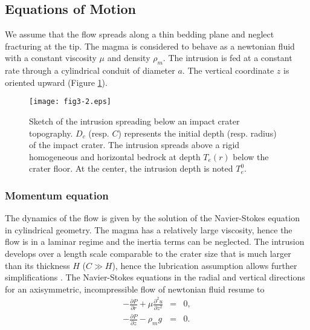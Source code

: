 \subsection{Equations of Motion}
	
We assume that the flow spreads along a thin bedding plane and neglect
fracturing  at the  tip.   The  magma is  considered  to  behave as  a
newtonian  fluid   with  a   constant  viscosity  $\mu$   and  density
$\rho_{m}$.   The  intrusion is  fed  at  a  constant rate  through  a
cylindrical conduit of  diameter $a$.  The vertical  coordinate $z$ is
oriented upward (Figure \ref{C5-fig3-2}).

\begin{figure}[h!]
  \graphicspath{ {/Users/thorey/Documents/These/Submission/Article/FFC_JGR_2013/Paper_APRES_2nd_REVIEW/} }
  \begin{center}
    \texttt{[image: fig3-2.eps]}
    \caption{Sketch of the intrusion  spreading below an impact crater
      topography.  $D_{c}$  (resp.  $C$) represents the  initial depth
      (resp. radius) of the impact crater. The intrusion spreads above
      a rigid  homogeneous and horizontal bedrock  at depth $T_{e}(r)$
      below the  crater floor. At  the center, the intrusion  depth is
      noted $T_{e}^0$.}
    \label{C5-fig3-2}
  \end{center}
\end{figure}
 	
\subsubsection{Momentum equation}
\label{C5-Equation_Momentum}
	
The dynamics of the flow is given by the solution of the Navier-Stokes
equation in  cylindrical geometry.  The  magma has a  relatively large
viscosity, hence the flow is in a laminar regime and the inertia terms
can  be  neglected.   The  intrusion  develops  over  a  length  scale
comparable to the  crater size that is much larger  than its thickness
$H$  ($C \gg  H$),  hence the  lubrication  assumption allows  further
simplifications       \citep{Huppert:1982a,Michaut:2009jx}.        The
Navier-Stokes equations in  the radial and vertical  directions for an
axisymmetric, incompressible flow of newtonian fluid resume to
\begin{eqnarray}
  -\frac{\partial P}{\partial r} + \mu \frac{\partial^{2}u}{\partial z^{2}} &=&0\label{C5-eq4}, \\
  -\frac{\partial P}{\partial z} - \rho_{m}g& =&0.
                                                 \label{C5-eq5}
\end{eqnarray}

